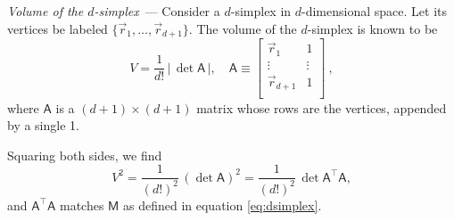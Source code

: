 \documentclass[10pt]{article}
\renewcommand{\paragraph}[1]{\par\addvspace{1em}\noindent\textsl{#1}~---}
\newcommand{\abs}[1]{|\,{#1}\,|}
\begin{document}
\paragraph{Volume of the $d$-simplex} Consider a $d$-simplex in $d$-dimensional space. Let its vertices be labeled $\{ \vec{r}_1, \dots, \vec{r}_{d+1} \}$. The volume of the $d$-simplex is known to be
\begin{equation}
    V = \frac{1}{d!} \, \abs{\det \mathsf{A}},
    \quad \mathsf{A} \equiv \left[ \begin{array}{cc}
        \vec{r}_1 & 1 \\
        \vdots & \vdots \\
        \vec{r}_{d+1} & 1 \\
    \end{array} \right]~,
\end{equation}
where $\mathsf{A}$ is a $(d+1) \times (d+1)$ matrix whose rows are the vertices, appended by a single 1.

Squaring both sides, we find
\begin{equation}
    V^2
    = \frac{1}{(d!)^2} \, (\det \mathsf{A})^2
    = \frac{1}{(d!)^2} \, \det \mathsf{A}^\top \mathsf{A},
\end{equation}
and $\mathsf{A}^\top \mathsf{A}$ matches $\mathsf{M}$ as defined in equation \eqref{eq:dsimplex}.
\end{document}
